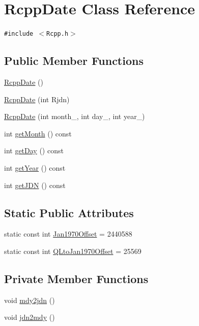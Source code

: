 \hypertarget{classRcppDate}{
\section{RcppDate Class Reference}
\label{classRcppDate}
}
{\tt \#include $<$Rcpp.h$>$}

\subsection*{Public Member Functions}
\begin{CompactItemize}
\item 
\hyperlink{classRcppDate_4f0f6ae9e9e284fd058d615bcd78d6f9}{RcppDate} ()
\item 
\hyperlink{classRcppDate_21adf306ddf84cf792f888d220bb9a3f}{RcppDate} (int Rjdn)
\item 
\hyperlink{classRcppDate_8b96145664d63ec84267870787025fa4}{RcppDate} (int month\_\-, int day\_\-, int year\_\-)
\item 
int \hyperlink{classRcppDate_16ca2d57a2c4047b027c8b8b0db5184f}{getMonth} () const 
\item 
int \hyperlink{classRcppDate_20efbcdddceac536425407b3169fff5a}{getDay} () const 
\item 
int \hyperlink{classRcppDate_79a7696fbce7b448ab545ce35c40811b}{getYear} () const 
\item 
int \hyperlink{classRcppDate_71332de00640903fe99ce13a37fd9f67}{getJDN} () const 
\end{CompactItemize}
\subsection*{Static Public Attributes}
\begin{CompactItemize}
\item 
static const int \hyperlink{classRcppDate_44b0643ab19489a0fb9700d25f504902}{Jan1970Offset} = 2440588
\item 
static const int \hyperlink{classRcppDate_06b285d4a04c5225a067e76d4fbfd2d4}{QLtoJan1970Offset} = 25569
\end{CompactItemize}
\subsection*{Private Member Functions}
\begin{CompactItemize}
\item 
void \hyperlink{classRcppDate_aaa626a51e3b2eb4978caf5dcdf9df70}{mdy2jdn} ()
\item 
void \hyperlink{classRcppDate_ca9e6ccbf5bf76e9bba92f2a3083c135}{jdn2mdy} ()
\end{CompactItemize}
